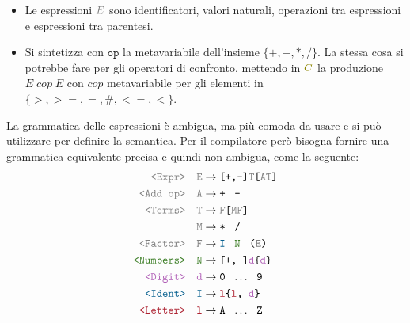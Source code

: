 \documentclass[a4paper]{article}
\begin{document}
\begin{itemize}
  \item Le espressioni \( \color{gray}E \) sono identificatori, valori naturali,
    operazioni tra espressioni e espressioni tra parentesi.

  \item Si sintetizza con \( \texttt{op} \) la metavariabile dell’insieme
    \( \{+, -, *, /\} \). La stessa cosa si potrebbe fare per gli operatori
    di confronto, mettendo in \( \color{olive}C \) la produzione \( E \; cop \; E \) con
    \( cop \) metavariabile per gli elementi in \( \{ >, >=, =, \#, <=, < \} \).
\end{itemize}
La grammatica delle espressioni è ambigua, ma più comoda da usare e si può utilizzare
per definire la semantica. Per il compilatore però bisogna fornire una grammatica
equivalente precisa e quindi non ambigua, come la seguente:
\[
  \begin{aligned}
    \texttt{\color{gray}<Expr>} \quad &\texttt{\color{gray}E\color{black}} \to
    \texttt{[+,-]\color{gray}
    T\color{black} [\color{gray}A\color{black} \color{gray}T\color{black}]} \\
    \texttt{\color{gray}<Add op>} \quad &\texttt{\color{gray}A\color{black}} \to
    \texttt{+} \color{BrickRed}\mid\color{black} \texttt{-} \\
    \texttt{\color{gray}<Terms>} \quad &\texttt{\color{gray}T\color{black}} \to
    \texttt{\color{gray}F\color{black} [\color{gray}M\color{black}
    \color{gray}F\color{black}]} \\
                                       &\texttt{\color{gray}M\color{black}} \to
                                       \texttt{*} \color{BrickRed}\mid\color{black}
                                       \texttt{/} \\
    \texttt{\color{gray}<Factor>} \quad &\texttt{\color{gray}F\color{black}} \to 
    \color{MidnightBlue}\texttt{I}\color{black} \color{BrickRed}\mid\color{black}
    \color{OliveGreen}\texttt{N}\color{black} \color{BrickRed}\mid\color{black} \texttt{\color{black}(\color{gray}E\color{black})} \\
    \texttt{\color{OliveGreen}{<Numbers>}} \quad &\texttt{\color{OliveGreen}N\color{black}}
    \to \texttt{[+,-]\color{Orchid}d\color{black}\{\color{Orchid}d\color{black}\}} \\
    \texttt{\color{Orchid}{<Digit>}} \quad &\texttt{\color{Orchid}d\color{black}} \to
    \texttt{0} \color{BrickRed}\mid\color{black} \ldots \color{BrickRed}\mid\color{black} \texttt{9} \\
    \texttt{\color{MidnightBlue}{<Ident>}} \quad &\texttt{\color{MidnightBlue}I\color{black}} \to
    \texttt{\color{Maroon}l\color{black}\{\color{Maroon}l\color{black},
    \color{Orchid}d\color{black}\}} \\
    \texttt{\color{Maroon}{<Letter>}} \quad &\texttt{\color{Maroon}l\color{black}} \to
    \texttt{A} \color{BrickRed}\mid\color{black} \ldots \color{BrickRed}\mid\color{black} \texttt{Z}
  \end{aligned}
\] 
\end{document}
